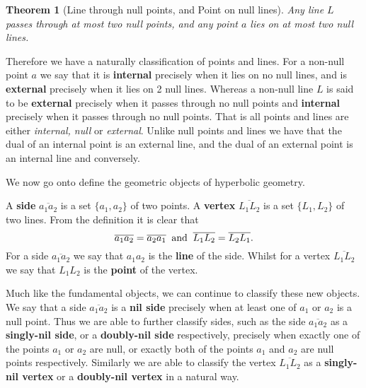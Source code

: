 \documentclass[11pt]{article}
\newtheorem{theorem}{Theorem}
\begin{document}
\begin{theorem}[Line through null points, and Point on null lines]
Any line $L$ passes through at most two null points, and any point $a$ lies
on at most two null lines.
\end{theorem}

Therefore we have a naturally classification of points and lines. For a
non-null point $a$ we say that it is \textbf{internal} precisely when it
lies on no null lines, and is \textbf{external} precisely when it lies on 2
null lines. Whereas a non-null line $L$ is said to be \textbf{external}
precisely when it passes through no null points and \textbf{internal}
precisely when it passes through no null points. That is all points and
lines are either \textit{internal, null} or \textit{external}.\newline
Unlike null points and lines we have that the dual of an internal point is
an external line, and the dual of an external point is an internal line and
conversely.

\pagebreak

We now go onto define the geometric objects of hyperbolic geometry.\newline

A \textbf{side} $\overline{a_{1}a_{2}}$ is a set $\{a_{1},a_{2}\}$ of two
points. A \textbf{vertex} $\overline{L_{1}L_{2}}$ is a set $\{L_{1},L_{2}\}$
of two lines. From the definition it is clear that 
\begin{equation*}
\overline{a_{1}a_{2}}=\overline{a_{2}a_{1}}\;\; \text{and}\;\;\overline{%
L_{1}L_{2}}=\overline{L_{2}L_{1}}.
\end{equation*}
For a side $\overline{a_{1}a_{2}}$ we say that $a_{1}a_{2}$ is the \textbf{%
line} of the side. Whilst for a vertex $\overline{L_{1}L_{2}}$ we say that $%
L_{1}L_{2}$ is the \textbf{point} of the vertex.\newline

Much like the fundamental objects, we can continue to classify these new
objects. We say that a side $\overline{a_{1}a_{2}}$ is a \textbf{nil side}
precisely when at least one of $a_{1}$ or $a_{2}$ is a null point. Thus we
are able to further classify sides, such as the side $\overline{a_{1}a_{2}}$
as a \textbf{singly-nil side}, or a \textbf{doubly-nil side} respectively,
precisely when exactly one of the points $a_{1}$ or $a_{2}$ are null, or
exactly both of the points $a_{1}$ and $a_{2}$ are null points respectively.
Similarly we are able to classify the vertex $\overline{L_{1}L_{2}}$ as a 
\textbf{singly-nil vertex} or a \textbf{doubly-nil vertex} in a natural way.%
\newline
\end{document}
